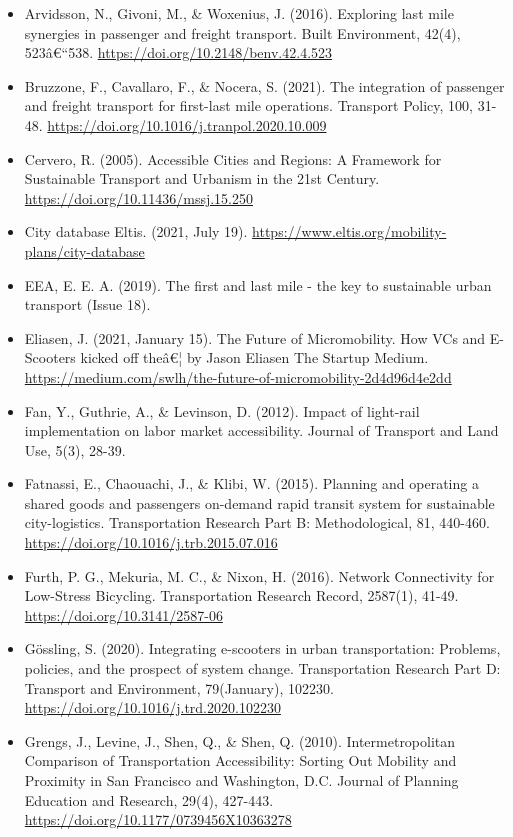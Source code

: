 \documentclass[
]{book}
\providecommand{\tightlist}{%
  \setlength{\itemsep}{0pt}\setlength{\parskip}{0pt}}
\begin{document}
\begin{itemize}
\tightlist
\item
  Arvidsson, N., Givoni, M., \& Woxenius, J. (2016). Exploring last mile synergies in passenger and freight transport. Built Environment, 42(4), 523â€``538. \url{https://doi.org/10.2148/benv.42.4.523}
\item
  Bruzzone, F., Cavallaro, F., \& Nocera, S. (2021). The integration of passenger and freight transport for first-last mile operations. Transport Policy, 100, 31-48. \url{https://doi.org/10.1016/j.tranpol.2020.10.009}
\item
  Cervero, R. (2005). Accessible Cities and Regions: A Framework for Sustainable Transport and Urbanism in the 21st Century. \url{https://doi.org/10.11436/mssj.15.250}
\item
  City database \textbar{} Eltis. (2021, July 19). \url{https://www.eltis.org/mobility-plans/city-database}
\item
  EEA, E. E. A. (2019). The first and last mile - the key to sustainable urban transport (Issue 18).
\item
  Eliasen, J. (2021, January 15). The Future of Micromobility. How VCs and E-Scooters kicked off theâ€¦ \textbar{} by Jason Eliasen \textbar{} The Startup \textbar{} Medium. \url{https://medium.com/swlh/the-future-of-micromobility-2d4d96d4e2dd}
\item
  Fan, Y., Guthrie, A., \& Levinson, D. (2012). Impact of light-rail implementation on labor market accessibility. Journal of Transport and Land Use, 5(3), 28-39.
\item
  Fatnassi, E., Chaouachi, J., \& Klibi, W. (2015). Planning and operating a shared goods and passengers on-demand rapid transit system for sustainable city-logistics. Transportation Research Part B: Methodological, 81, 440-460. \url{https://doi.org/10.1016/j.trb.2015.07.016}
\item
  Furth, P. G., Mekuria, M. C., \& Nixon, H. (2016). Network Connectivity for Low-Stress Bicycling. Transportation Research Record, 2587(1), 41-49. \url{https://doi.org/10.3141/2587-06}
\item
  Gössling, S. (2020). Integrating e-scooters in urban transportation: Problems, policies, and the prospect of system change. Transportation Research Part D: Transport and Environment, 79(January), 102230. \url{https://doi.org/10.1016/j.trd.2020.102230}
\item
  Grengs, J., Levine, J., Shen, Q., \& Shen, Q. (2010). Intermetropolitan Comparison of Transportation Accessibility: Sorting Out Mobility and Proximity in San Francisco and Washington, D.C. Journal of Planning Education and Research, 29(4), 427-443. \url{https://doi.org/10.1177/0739456X10363278}

\end{itemize}
\end{document}

